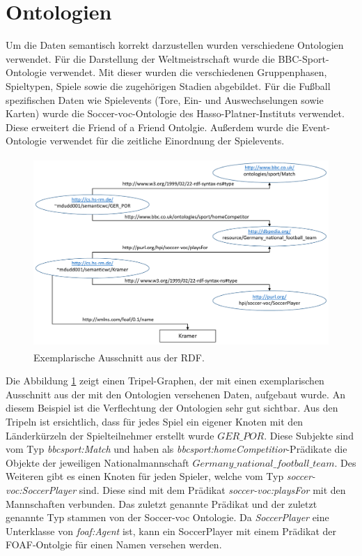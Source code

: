 \documentclass[runningheads,a4paper]{llncs}
\begin{document}
\newpage
\section{Ontologien}
Um die Daten semantisch korrekt darzustellen wurden verschiedene Ontologien verwendet. Für die Darstellung der Weltmeistrschaft wurde die BBC-Sport-Ontologie verwendet. Mit dieser wurden die verschiedenen Gruppenphasen, Spieltypen, Spiele sowie die zugehörigen Stadien abgebildet. Für die Fußball spezifischen Daten wie Spielevents (Tore, Ein- und Auswechselungen sowie Karten) wurde die Soccer-voc-Ontologie des Hasso-Platner-Instituts verwendet. Diese erweitert die Friend of a Friend Ontolgie. Außerdem wurde die Event-Ontologie verwendet für die zeitliche Einordnung der Spielevents.

\begin{figure}
\centering
\includegraphics[height=7.2cm]{graph_manus}
\caption{Exemplarische Ausschnitt aus der RDF.}
\label{fig:example}
\end{figure}

Die Abbildung \ref{fig:example} zeigt einen Tripel-Graphen, der mit einen exemplarischen Ausschnitt aus der mit den Ontologien versehenen Daten, aufgebaut wurde. An diesem Beispiel ist die Verflechtung der Ontologien sehr gut sichtbar.
Aus den Tripeln ist ersichtlich, dass für jedes Spiel ein eigener Knoten mit den Länderkürzeln der Spielteilnehmer erstellt wurde \(GER\_POR\). Diese Subjekte sind vom Typ \textit{bbcsport:Match} und haben als \textit{bbcsport:homeCompetitior}-Prädikate die Objekte der jeweiligen Nationalmannschaft \(Germany\_national\_football\_team\). 
Des Weiteren gibt es einen Knoten für jeden Spieler, welche vom Typ \textit{soccer-voc:SoccerPlayer} sind. Diese sind mit dem Prädikat \textit{soccer-voc:playsFor} mit den Mannschaften verbunden. Das zuletzt genannte Prädikat und der zuletzt genannte Typ stammen von der Soccer-voc Ontologie. Da \textit{SoccerPlayer} eine Unterklasse von \textit{foaf:Agent} ist, kann ein SoccerPlayer mit einem Prädikat der FOAF-Ontolgie für einen Namen versehen werden.
\newpage
\end{document}

